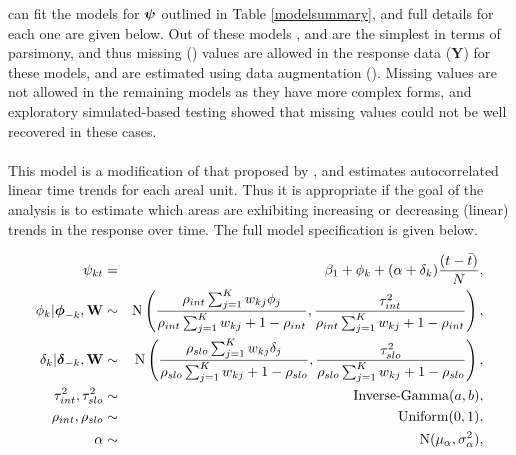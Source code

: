 \documentclass[article, nojss]{jss}
\newcommand{\bd}[1]{\ensuremath{\mbox{\boldmath $#1$}}}
\begin{document}
\hspace{1cm}  can fit the models for $\bd{\psi}$ outlined in Table \ref{modelsummary}, and full details for each one are given below. Out of these models ,  and  are the simplest in terms of parsimony, and thus missing () values are allowed in the response data ($\mathbf{Y}$) for these models, and are estimated using data augmentation (\citealp{tanner1987}). Missing values are not allowed in the remaining models as they have more complex forms, and exploratory simulated-based testing showed that missing values could not be well recovered in these cases.\\

\\
This model  is a modification of that proposed by \cite{bernardinelli1995}, and estimates autocorrelated linear time trends for each areal unit. Thus it is  appropriate if the goal of the analysis is to estimate which areas are exhibiting increasing or decreasing (linear) trends in the response over time. The full model specification is given below.

\begin{eqnarray}
\psi_{kt}&=&\beta_{1} + \phi_k + (\alpha + \delta_k)\frac{(t - \bar{t})}{N},\label{carlinear}\\
\phi_k|\bd{\phi}_{-k},\mathbf{W}&\sim&\mbox{N}\left(\frac{\rho_{int}\sum_{j=1}^Kw_{kj}\phi_j}{\rho_{int}\sum_{j=1}^Kw_{kj} + 1-\rho_{int}}, \frac{\tau^2_{int}}{\rho_{int}\sum_{j=1}^Kw_{kj} + 1-\rho_{int}}\right),\nonumber\\
\delta_k|\bd{\delta}_{-k},\mathbf{W}&\sim&\mbox{N}\left(\frac{\rho_{slo}\sum_{j=1}^Kw_{kj}\delta_j}{\rho_{slo}\sum_{j=1}^Kw_{kj} + 1-\rho_{slo}}, \frac{\tau^2_{slo}}{\rho_{slo}\sum_{j=1}^Kw_{kj} + 1-\rho_{slo}}\right),\nonumber\\
\tau^2_{int}, \tau^2_{slo}&\sim&\mbox{Inverse-Gamma}(a,b),\nonumber\\
\rho_{int},\rho_{slo}&\sim&\mbox{Uniform}(0,1),\nonumber\\
\alpha&\sim&\mbox{N}(\mu_{\alpha}, \sigma^2_{\alpha}),\nonumber
\end{eqnarray}
\end{document}
